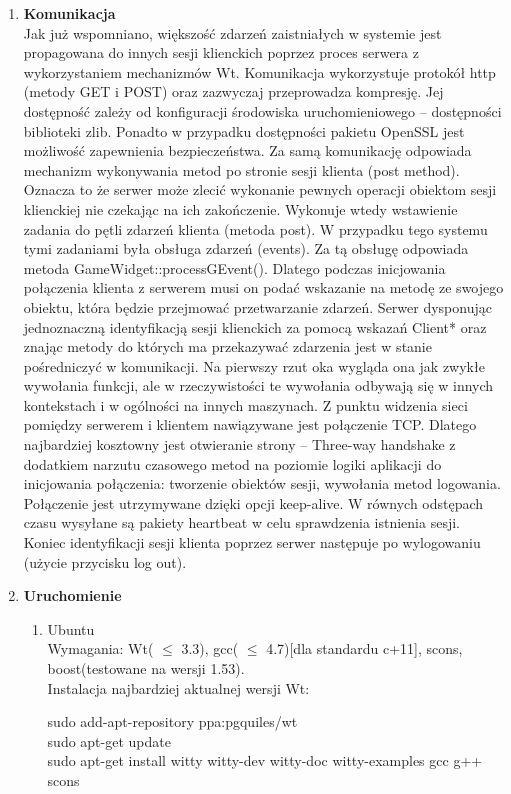 \documentclass{report}
\begin{document}
\begin{enumerate}
\item \textbf{Komunikacja} \\
Jak już wspomniano, większość zdarzeń zaistniałych w systemie jest propagowana do innych sesji klienckich poprzez proces serwera z wykorzystaniem mechanizmów Wt. Komunikacja wykorzystuje protokół http (metody GET i POST) oraz zazwyczaj przeprowadza  kompresję. Jej dostępność zależy od konfiguracji środowiska uruchomieniowego – dostępności biblioteki zlib.
Ponadto w przypadku dostępności pakietu OpenSSL jest możliwość zapewnienia bezpieczeństwa.
Za samą komunikację odpowiada mechanizm wykonywania metod po stronie sesji klienta (post method). Oznacza to że serwer może zlecić wykonanie pewnych operacji obiektom sesji klienckiej nie czekając na ich zakończenie. Wykonuje wtedy wstawienie zadania do pętli zdarzeń klienta (metoda post). W przypadku tego systemu tymi zadaniami była obsługa zdarzeń (events). Za tą obsługę odpowiada metoda GameWidget::processGEvent().
Dlatego podczas inicjowania połączenia klienta z serwerem musi on podać wskazanie na metodę ze swojego obiektu, która będzie przejmować przetwarzanie zdarzeń. Serwer dysponując jednoznaczną identyfikacją sesji klienckich za pomocą wskazań Client* oraz znając metody do których ma przekazywać zdarzenia jest w stanie pośredniczyć w komunikacji. Na pierwszy rzut oka wygląda ona jak zwykłe wywołania funkcji, ale w rzeczywistości te wywołania odbywają się w innych kontekstach i w ogólności na innych maszynach.
Z punktu widzenia sieci pomiędzy serwerem i klientem nawiązywane jest połączenie TCP. Dlatego najbardziej kosztowny jest otwieranie strony – Three-way handshake z dodatkiem narzutu czasowego metod na poziomie logiki aplikacji do inicjowania połączenia: tworzenie obiektów sesji, wywołania metod logowania. Połączenie jest utrzymywane dzięki opcji keep-alive. W równych odstępach czasu wysyłane są pakiety heartbeat w celu sprawdzenia istnienia sesji.
Koniec identyfikacji sesji klienta poprzez serwer następuje po wylogowaniu (użycie przycisku log out).
\\

\item \textbf{Uruchomienie}
\begin{enumerate}
\item Ubuntu \\
Wymagania: Wt( $ \leq $ 3.3), gcc( $ \leq $ 4.7)[dla standardu c+11], scons, boost(testowane na wersji 1.53). \\
Instalacja najbardziej aktualnej wersji Wt:

sudo add-apt-repository ppa:pgquiles/wt \\
sudo apt-get update \\
sudo apt-get install witty witty-dev witty-doc witty-examples gcc g++ scons  \\


\end{enumerate}
\end{enumerate}
\end{document}
